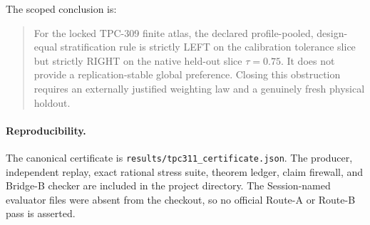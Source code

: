\documentclass[10pt,a4paper]{article}
\begin{document}
The scoped conclusion is:
\begin{quote}
For the locked TPC-309 finite atlas, the declared profile-pooled,
design-equal stratification rule is strictly LEFT on the calibration tolerance
slice but strictly RIGHT on the native held-out slice $\tau=0.75$.  It does
not provide a replication-stable global preference.  Closing this obstruction
requires an externally justified weighting law and a genuinely fresh physical
holdout.
\end{quote}

\paragraph{Reproducibility.}
The canonical certificate is
\texttt{results/tpc311\_certificate.json}.  The producer, independent replay,
exact rational stress suite, theorem ledger, claim firewall, and Bridge-B
checker are included in the project directory.  The Session-named evaluator
files were absent from the checkout, so no official Route-A or Route-B pass is
asserted.


\begingroup\small

\endgroup
\end{document}
